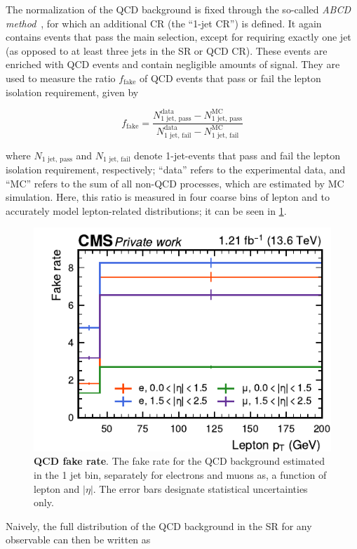The normalization of the QCD background is fixed through the so-called \textit{ABCD method}~\cite{CDF:1995eix,CDF:2000gwd}, for which an additional CR (the ``1-jet CR'') is defined.
It again contains events that pass the main selection, except for requiring exactly one jet (as opposed to at least three jets in the SR or QCD CR). These events are enriched with QCD events and contain negligible amounts of \ttbar signal. They are used to measure the ratio $f_{\mathrm{fake}}$ of QCD events that pass or fail the lepton isolation requirement, given by

\begin{equation}
\label{eq:ttxs:abcd_fakerate}
    f_{\mathrm{fake}} = \frac{ N_{\text{1 jet, pass}}^{\text{data}} - N_{\text{1 jet, pass}}^{\text{MC}} }{ N_{\text{1 jet, fail}}^{\text{data}} - N_{\text{1 jet, fail}}^{\text{MC}} }
\end{equation}

\noindent where $N_{\text{1 jet, pass}}$ and $N_{\text{1 jet, fail}}$ denote 1-jet-events that pass and fail the lepton isolation requirement, respectively; ``data'' refers to the experimental data, and ``MC'' refers to the sum of all non-QCD processes, which are estimated by MC simulation. Here, this ratio is measured in four coarse bins of lepton \pt and \abseta to accurately model lepton-related distributions; it can be seen in \cref{fig:ttxs:fakerate}.

\begin{figure}[!ht]
    \centering
    \includegraphics[width=0.58 \textwidth]{figures/ttxs/np_plots_run3/fakerate.pdf}
    \caption{\textbf{QCD fake rate}. The fake rate for the QCD background estimated in the 1 jet bin, separately for electrons and muons as, a function of lepton \pt and $|\eta|$. The error bars designate statistical uncertainties only.}
    \label{fig:ttxs:fakerate}
\end{figure}

Naively, the full distribution of the QCD background in the SR for any observable can then be written as

